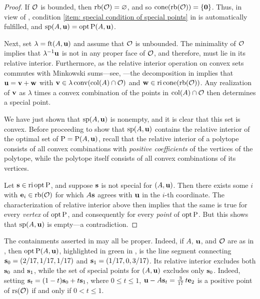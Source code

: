 \documentclass{amsart}
\begin{document}
\begin{proof}
   If $\mathcal{O}$ is bounded, then $\operatorname{rb}(\mathcal{O}) = \varnothing$, and so $\operatorname{cone}( \operatorname{rb}(\mathcal{O})) = \{\mathbf{0} \}$.
   Thus, in view of , condition \eqref{item: special condition of special points} in  is automatically fulfilled, and $\operatorname{sp}(A, \mathbf{u}) = \operatorname{opt} \mathrm{P}(A, \mathbf{u})$.

   Next, set $\lambda = \operatorname{ft}(A, \mathbf{u})$ and assume that $\mathcal{O}$ is unbounded.
   The minimality of $\mathcal{O}$ implies that $\lambda^{-1}\mathbf{u}$ is not in any proper face of $\mathcal{O}$, and therefore, must lie in its relative interior.
   Furthermore, as the relative interior operation on convex sets commutes with Minkowski sums---see, \eg \cite[Theorem 4.10(b)]{vantiel.convex_analysis}---the decomposition in   implies that $\mathbf{u} = \mathbf{v} + \mathbf{w}$ with $\mathbf{v} \in \lambda \operatorname{conv}(\operatorname{col}(A) \cap \mathcal{O})$ and $\mathbf{w} \in \operatorname{ri} \operatorname{cone}(\operatorname{rb}(\mathcal{O}))$.  Any realization of $\mathbf{v}$ as $\lambda$ times a convex combination of the points in $\operatorname{col}(A) \cap \mathcal{O}$ then determines a special point.

   We have just shown that $\operatorname{sp}(A, \mathbf{u})$ is nonempty, and it is clear that this set is convex.
   Before proceeding to show that $\operatorname{sp}(A, \mathbf{u})$ contains the relative interior of the optimal set of $\mathrm{P} = \mathrm{P}(A,\mathbf{u})$, recall that the relative interior of a polytope consists of all convex combinations with \emph{positive coefficients} of the vertices of the polytope, while the polytope itself consists of all convex combinations of its vertices.

  Let $\mathbf{s} \in \operatorname{ri} \operatorname{opt} \mathrm{P}$, and suppose $\mathbf{s}$ is not special for $(A,\mathbf{u})$.
  Then there exists some $i$ with $\mathbf{e}_i \in \operatorname{rb}(\mathcal{O})$ for which $A\mathbf{s}$ agrees with $\mathbf{u}$ in the $i$-th coordinate.
  The characterization of relative interior above then implies that the same is true for every \emph{vertex} of $\operatorname{opt} \mathrm{P}$, and consequently for every \emph{point} of $\operatorname{opt} \mathrm{P}$.
  But this shows that $\operatorname{sp}(A,\mathbf{u})$ is empty---a contradiction.
\end{proof}

\begin{example}
   \label{ex: ft.1}
   The containments asserted in  may all be proper.
   Indeed, if $A$, $\mathbf{u}$, and $\mathcal{O}$ are as in , then $\operatorname{opt} \mathrm{P}(A,\mathbf{u})$, highlighted in green in , is the line segment connecting $\mathbf{s}_0 = (2/17, 1/17, 1/17)$ and $\mathbf{s}_1 = (1/17, 0, 3/17)$.
   Its relative interior excludes both $\mathbf{s}_0$ and $\mathbf{s}_1$, while the set of special points for $(A,\mathbf{u})$ excludes only $\mathbf{s}_0$.
   Indeed, setting $\mathbf{s}_t=(1-t)\mathbf{s}_0 + t \mathbf{s}_1$, where $0\le t\le 1$, $\mathbf{u} - A\mathbf{s}_t = \frac{3}{17}\,t \mathbf{e}_2$ is a positive point of $\operatorname{rs}(\mathcal{O})$ if and only if $0<t\le 1$.
\end{example}
\end{document}
